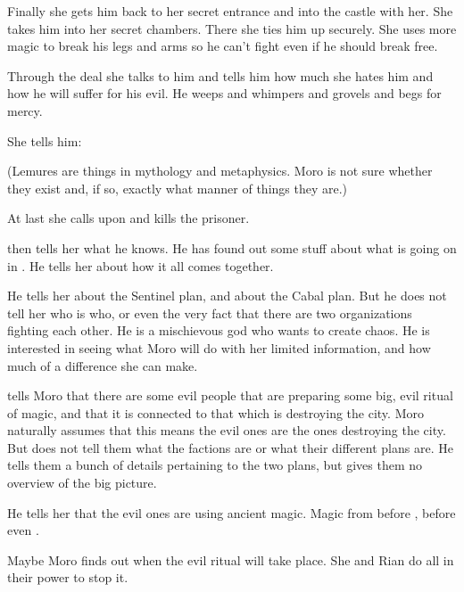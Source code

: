 
Finally she gets him back to her secret entrance and into the castle with her. 
She takes him into her secret chambers.
There she ties him up securely.
She uses more magic to break his legs and arms so he can't fight even if he should break free.

Through the deal she talks to him and tells him how much she hates him and how he will suffer for his evil.
He weeps and whimpers and grovels and begs for mercy.

She tells him: 

(Lemures are things in mythology and metaphysics. Moro is not sure whether they exist and, if so, exactly what manner of things they are.)



\begin{comment}
  \subsection{Nasshikerr arrives}
\end{comment}

At last she calls upon \Nasshikerr and kills the prisoner.

\Nasshikerr then tells her what he knows.
He has found out some stuff about what is going on in \Malcur. 
He tells her about how it all comes together. 

He tells her about the Sentinel plan, and about the Cabal plan.
But he does not tell her who is who, or even the very fact that there are two organizations fighting each other. 
He is a mischievous god who wants to create chaos.
He is interested in seeing what Moro will do with her limited information, and how much of a difference she can make.

\Nasshikerr tells Moro that there are some evil people that are preparing some big, evil ritual of magic, and that it is connected to that which is destroying the city.
Moro naturally assumes that this means the evil ones are the ones destroying the city.
But \Nasshikerr does not tell them what the factions are or what their different plans are.
He tells them a bunch of details pertaining to the two plans, but gives them no overview of the big picture. 

He tells her that the evil ones are using ancient magic. 
Magic from before \humans, before even \scathae. 

Maybe Moro finds out when the evil ritual will take place.
She and Rian do all in their power to stop it. 









